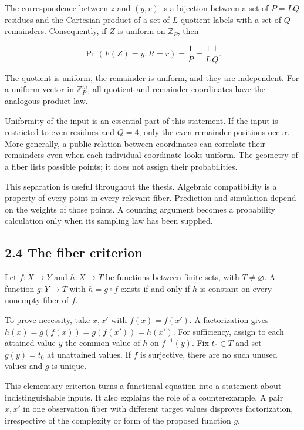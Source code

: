 \documentclass[
]{article}
\begin{document}
The correspondence between \(z\) and \((y,r)\) is a bijection between a
set of \(P=LQ\) residues and the Cartesian product of a set of \(L\)
quotient labels with a set of \(Q\) remainders. Consequently, if \(Z\)
is uniform on \(\mathbb Z_P\), then

\[
\Pr(F(Z)=y,R=r)=\frac1P=\frac1L\frac1Q.
\]

The quotient is uniform, the remainder is uniform, and they are
independent. For a uniform vector in \(\mathbb Z_P^m\), all quotient and
remainder coordinates have the analogous product law.

Uniformity of the input is an essential part of this statement. If the
input is restricted to even residues and \(Q=4\), only the even
remainder positions occur. More generally, a public relation between
coordinates can correlate their remainders even when each individual
coordinate looks uniform. The geometry of a fiber lists possible points;
it does not assign their probabilities.

This separation is useful throughout the thesis. Algebraic compatibility
is a property of every point in every relevant fiber. Prediction and
simulation depend on the weights of those points. A counting argument
becomes a probability calculation only when its sampling law has been
supplied.

\subsection{2.4 The fiber criterion}\label{the-fiber-criterion}

Let \(f:X\to Y\) and \(h:X\to T\) be functions between finite sets, with
\(T\ne\varnothing\). A function \(g:Y\to T\) with \(h=g\circ f\) exists
if and only if \(h\) is constant on every nonempty fiber of \(f\).

To prove necessity, take \(x,x'\) with \(f(x)=f(x')\). A factorization
gives \(h(x)=g(f(x))=g(f(x'))=h(x')\). For sufficiency, assign to each
attained value \(y\) the common value of \(h\) on \(f^{-1}(y)\). Fix
\(t_0\in T\) and set \(g(y)=t_0\) at unattained values. If \(f\) is
surjective, there are no such unused values and \(g\) is unique.

This elementary criterion turns a functional equation into a statement
about indistinguishable inputs. It also explains the role of a
counterexample. A pair \(x,x'\) in one observation fiber with different
target values disproves factorization, irrespective of the complexity or
form of the proposed function \(g\).
\end{document}
